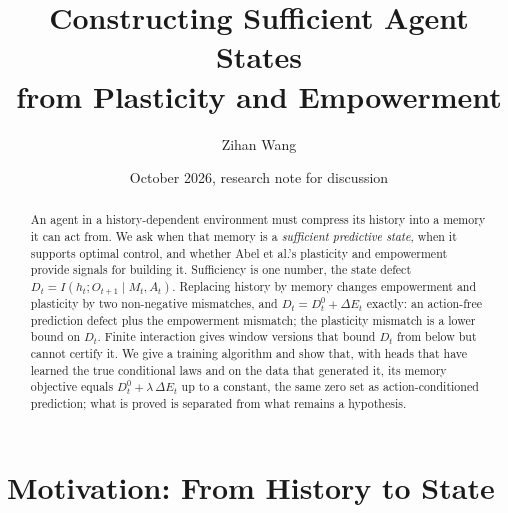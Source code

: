 \documentclass[11pt]{article}
\title{Constructing Sufficient Agent States\\ from Plasticity and Empowerment}
\author{Zihan Wang}
\date{\vspace{-1.2em}October 2026, research note for discussion\vspace{-1em}}
\theoremstyle{plain}
\theoremstyle{definition}
\theoremstyle{remark}
\newcommand{\dE}{\Delta E}
\begin{document}
\maketitle

\begin{abstract}
An agent in a history-dependent environment must compress its history into a memory it can act from. We ask when that memory is a \emph{sufficient predictive state}, when it supports optimal control, and whether Abel et al.'s plasticity and empowerment provide signals for building it. Sufficiency is one number, the state defect $D_t = I(h_t; O_{t+1}\mid M_t, A_t)$. Replacing history by memory changes empowerment and plasticity by two non-negative mismatches, and $D_t = D^0_t + \dE_t$ exactly: an action-free prediction defect plus the empowerment mismatch; the plasticity mismatch is a lower bound on $D_t$. Finite interaction gives window versions that bound $D_t$ from below but cannot certify it. We give a training algorithm and show that, with heads that have learned the true conditional laws and on the data that generated it, its memory objective equals $D^0_t + \lambda\,\dE_t$ up to a constant, the same zero set as action-conditioned prediction; what is proved is separated from what remains a hypothesis.
\end{abstract}

\section{Motivation: From History to State}
\end{document}
